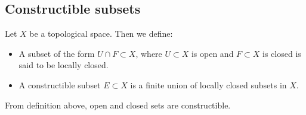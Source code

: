 \subsection{Constructible subsets}
\begin{dang}
\begin{definition}
    Let $X$ be a topological space. Then we define:
    \begin{itemize}
        \item[(1)] A subset of the form $U\cap F\subset X$, where $U\subset X$ is open and $F\subset X$ is closed 
        is said to be locally closed.
        \item[(2)] A constructible subset $E\subset X$ is a finite union of locally closed subsets in $X$.
    \end{itemize}
\end{definition}
\end{dang}
\begin{remark}
    From definition above, open and closed sets are constructible.
\end{remark}

